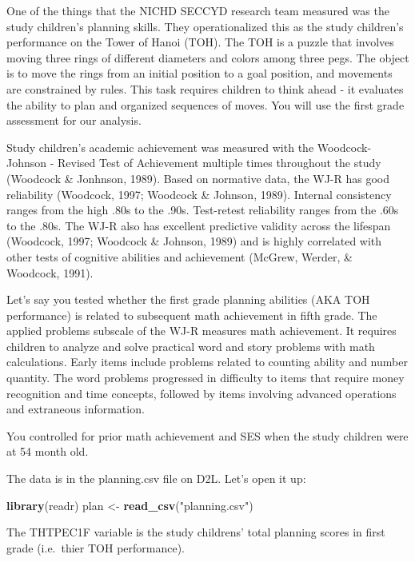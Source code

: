 \documentclass[
]{book}
\newenvironment{Shaded}{\begin{snugshade}}{\end{snugshade}}
\newcommand{\KeywordTok}[1]{\textcolor[rgb]{0.13,0.29,0.53}{\textbf{#1}}}
\newcommand{\NormalTok}[1]{#1}
\newcommand{\StringTok}[1]{\textcolor[rgb]{0.31,0.60,0.02}{#1}}
\begin{document}
One of the things that the NICHD SECCYD research team measured was the study children's planning skills. They operationalized this as the study children's performance on the Tower of Hanoi (TOH). The TOH is a puzzle that involves moving three rings of different diameters and colors among three pegs. The object is to move the rings from an initial position to a goal position, and movements are constrained by rules. This task requires children to think ahead - it evaluates the ability to plan and organized sequences of moves. You will use the first grade assessment for our analysis.

Study children's academic achievement was measured with the Woodcock-Johnson - Revised Test of Achievement multiple times throughout the study (Woodcock \& Jonhnson, 1989). Based on normative data, the WJ-R has good reliability (Woodcock, 1997; Woodcock \& Johnson, 1989). Internal consistency ranges from the high .80s to the .90s. Test-retest reliability ranges from the .60s to the .80s. The WJ-R also has excellent predictive validity across the lifespan (Woodcock, 1997; Woodcock \& Johnson, 1989) and is highly correlated with other tests of cognitive abilities and achievement (McGrew, Werder, \& Woodcock, 1991).

Let's say you tested whether the first grade planning abilities (AKA TOH performance) is related to subsequent math achievement in fifth grade. The applied problems subscale of the WJ-R measures math achievement. It requires children to analyze and solve practical word and story problems with math calculations. Early items include problems related to counting ability and number quantity. The word problems progressed in difficulty to items that require money recognition and time concepts, followed by items involving advanced operations and extraneous information.

You controlled for prior math achievement and SES when the study children were at 54 month old.

The data is in the planning.csv file on D2L. Let's open it up:

\begin{Shaded}
\begin{Highlighting}[]
\KeywordTok{library}\NormalTok{(readr)}
\NormalTok{plan <-}\StringTok{ }\KeywordTok{read_csv}\NormalTok{(}\StringTok{"planning.csv"}\NormalTok{)}
\end{Highlighting}
\end{Shaded}

The THTPEC1F variable is the study childrens' total planning scores in first grade (i.e.~thier TOH performance).
\end{document}
